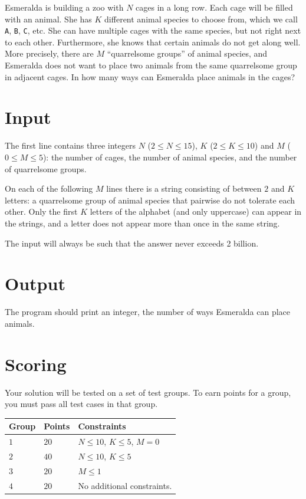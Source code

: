 Esmeralda is building a zoo with $N$ cages in a long row.
Each cage will be filled with an animal. She has $K$ different animal species to choose from, which we call \texttt{A}, \texttt{B}, \texttt{C}, etc. She can have multiple cages with the same species, but not right next to each other. Furthermore, she knows that certain animals do not get along well. More precisely, there are $M$ ``quarrelsome groups'' of animal species, and Esmeralda does not want to place two animals from the same quarrelsome group in adjacent cages. In how many ways can Esmeralda place animals in the cages?

\section*{Input}
The first line contains three integers $N$ ($2 \le N \le 15$), $K$ ($2 \le K \le 10$) and $M$ ($0 \le M \le 5$): the number of cages, the number of animal species, and the number of quarrelsome groups.

On each of the following $M$ lines there is a string consisting of between $2$ and $K$ letters: a quarrelsome group of animal species that pairwise do not tolerate each other.
Only the first $K$ letters of the alphabet (and only uppercase) can appear in the strings, and a letter does not appear more than once in the same string.

The input will always be such that the answer never exceeds 2 billion.

\section*{Output}
The program should print an integer, the number of ways Esmeralda can place animals.

\section*{Scoring}
Your solution will be tested on a set of test groups.
To earn points for a group, you must pass all test cases in that group.

\noindent
\begin{tabular}{| l | l | l |}
  \hline
  \textbf{Group} & \textbf{Points} & \textbf{Constraints} \\ \hline
  $1$    & $20$        &  $N \le 10$, $K \le 5$, $M=0$\\ \hline
  $2$    & $40$        &  $N \le 10$, $K \le 5$ \\ \hline
  $3$    & $20$        &  $M \le 1$ \\ \hline
  $4$    & $20$        &  No additional constraints. \\ \hline
\end{tabular}

